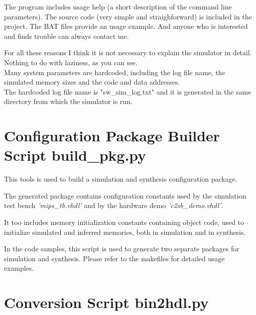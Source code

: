     The program includes usage help (a short description of the command line 
    parameters). The source code (very simple and straighforward) is included in
    the project. The BAT files provide an usage example. And anyone who is 
    interested and finds trouble can always contact me.
    
    For all these reasons I think it is not necessary to explain the simulator 
    in detail. Nothing to do with laziness, as you can see.\\
    
    Many system parameters are hardcoded, including the log file name, the
    simulated memory sizes and the code and data addresses.\\

    The hardcoded log file name is "sw\_sim\_log.txt" and it is generated in the 
    same directory from which the simulator is run.\\

\section{Configuration Package Builder Script build\_pkg.py}
\label{python_script}
    
    This tools is used to build a simulation and synthesis configuration 
    package.
    
    The generated package contains configuration constants used by the 
    simulation test bench \emph{'mips\_tb.vhdl'} and by the hardware demo 
    \emph{'c2sb\_demo.vhdl'}.
    
    It too includes memory initialization constants containing object code,
    used to initialize simulated and inferred memories, both in simulation
    and in synthesis.
    
    In the code samples, this script is used to generate two separate packages
    for simulation and synthesis. Please refer to the makefiles for detailed
    usage examples.
    
    
\section{Conversion Script bin2hdl.py}
\label{python_script}

